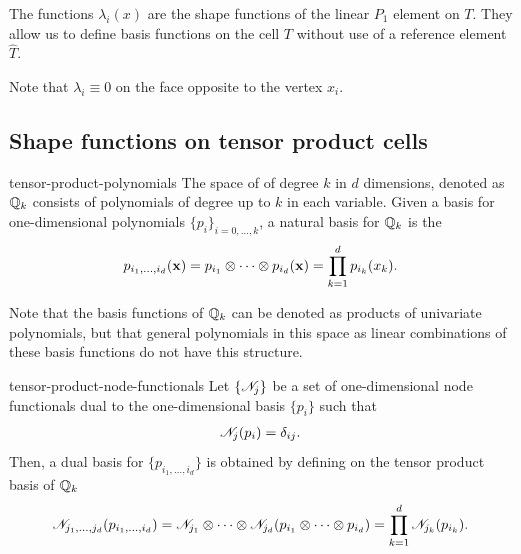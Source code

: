 \begin{remark}
  The functions $\lambda_i(x)$ are the shape functions of the linear
  $P_1$ element on $T$. They allow us to define basis functions on the
  cell $T$ without use of a reference element $\widehat T$.

  Note that $\lambda_i\equiv 0$ on the face opposite to the
  vertex $x_i$.
\end{remark}

\subsection{Shape functions on tensor product cells}

\begin{Definition}{tensor-product-polynomials}
  The space of  of degree $k$ in
  $d$ dimensions, denoted as $\mathbb Q_k$ consists of polynomials of degree
  up to $k$ in each variable. Given a basis for one-dimensional
  polynomials $\{p_i\}_{i=0,\dots,k}$, a natural basis for $\mathbb Q_k$ is
  the 
  \begin{gather}
    \label{eq:fem-intro:1}
    p_{i_1,\dots,i_d}(\mathbf x)
    = p_{i_1}\otimes \dots\otimes p_{i_d}(\mathbf x)
    = \prod_{k=1}^d p_{i_k}(x_k).
  \end{gather}
\end{Definition}

\begin{remark}
  Note that the basis functions of $\mathbb Q_k$ can be denoted as products
  of univariate polynomials, but that general polynomials in this
  space as linear combinations of these basis functions do not have
  this structure.
\end{remark}

\begin{Lemma}{tensor-product-node-functionals}
  Let $\{\mathscr N_j\}$ be a set of one-dimensional node functionals dual
  to the one-dimensional basis $\{p_i\}$ such that
  \begin{gather}
    \mathscr N_j(p_i) = \delta_{ij}.
  \end{gather}
  Then, a dual basis for $\{p_{i_1,\dots,i_d}\}$ is obtained by
  defining on the tensor product basis of $\mathbb Q_k$
  \begin{gather}
    \label{eq:fem-intro:2}
    \mathscr N_{j_1,\dots,j_d}(p_{i_1,\dots,i_d})
    = \mathscr N_{j_1} \otimes \dots\otimes \mathscr N_{j_d}(p_{i_1}\otimes\dots\otimes p_{i_d})
    = \prod_{k=1}^d \mathscr N_{j_k}(p_{i_k}).
  \end{gather}
\end{Lemma}

